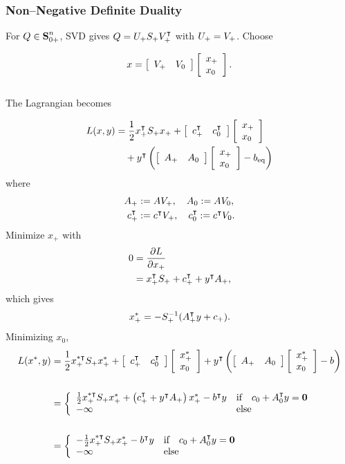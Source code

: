 \documentclass{article}
\begin{document}

\subsubsection{Non--Negative Definite Duality}

    For $Q\in\textbf{S}_{0+}^n$, SVD gives $Q=U_+S_+V_+^\intercal$ with $U_+=V_+$.  
    Choose 

    \begin{align*}
        x=\left[\begin{array}{lllllllllllllllllll}V_+   & V_0 \end{array}\right]\left[\begin{array}{lllllllllllllllllll}x_+\\x_0\end{array}\right].
    \end{align*}
    \\
    The Lagrangian becomes

    \begin{align*}
        L(x,y) &= \frac{1}{2} x_+^\intercal S_+ x_+ +  \left[\begin{array}{lllllllllllllllllll}c_+^\intercal   & c_0^\intercal \end{array}\right]\left[\begin{array}{lllllllllllllllllll}x_+\\x_0\end{array}\right]  \\
        &\quad+ y^\intercal \left( \left[\begin{array}{lllllllllllllllllll}A_+   & A_0 \end{array}\right]\left[\begin{array}{lllllllllllllllllll}x_+\\x_0\end{array}\right] - b_{\text{eq}} \right)
    \end{align*}
    where
    \begin{align*}
        A_+&:=AV_+,\quad
        A_0:=AV_0,\\
        c_+^\intercal&:=c^\intercal V_+,\quad
        c_0^\intercal:=c^\intercal V_0.
    \end{align*}
    Minimize $x_+$ with 
    \begin{align*}
        0&=\frac{\partial L}{\partial x_+}\\
        &=x_+^\intercal S_++  
        c_+^\intercal   +
        y^\intercal A_+, 
    \end{align*}
    which gives
    \begin{align*}
        x_+^* =  -S_+^{-1}(A_+^\intercal y + c_+).
    \end{align*}
    Minimizing $x_0$,
    \begin{align*}
        L(x^*,y) &= \frac{1}{2} x_+^{*\intercal} S_+  x_+^* +  \left[\begin{array}{lllllllllllllllllll}c_+^\intercal   & c_0^\intercal \end{array}\right]\left[\begin{array}{lllllllllllllllllll}x_+^*\\x_0\end{array}\right]  
        + y^\intercal \left( \left[\begin{array}{lllllllllllllllllll}A_+   & A_0 \end{array}\right]\left[\begin{array}{lllllllllllllllllll}x_+^*\\x_0\end{array}\right] - b \right) \\\\
        &=\left\{
            \begin{array}{lllllllllllllllllll}
                \frac{1}{2} x_+^{*\intercal} S_+ x_+^{*}  +\left(   c_+^\intercal        
                +   y^\intercal A_+ \right) x_+^{*} - b^\intercal  y
            & \text{if\quad $c_0
            +A_0^\intercal y =\textbf{0}$} \\ 
        -\infty & \text{else}
        \end{array}
        \right.\\\\
        &=\left\{
            \begin{array}{lllllllllllllllllll}
                -\frac{1}{2} x_+^{*\intercal} S_+ x_+^{*} - b^\intercal  y
            & \text{if\quad $c_0
            +A_0^\intercal y =\textbf{0}$} \\ 
        -\infty & \text{else}
        \end{array}
        \right.
    \end{align*}
\end{document}
